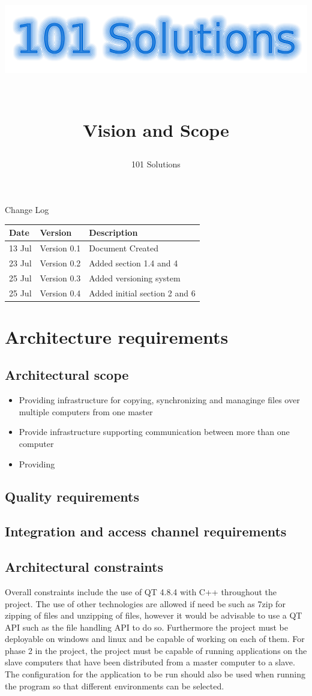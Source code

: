 \documentclass[a4paper,12pt,final]{article}
\title{
\begin{center}
  	\includegraphics[scale=0.3]{101Logo.png} 
  \end{center}
  \textbf{\\}
Vision and Scope\\
}  %
\author{101 Solutions}
\begin{document}
\maketitle
\thispagestyle{empty}
\newpage
\tableofcontents
\thispagestyle{empty}
\newpage
Change Log
\vspace{6pt}\newline
\begin{tabular}{|l|l|l|}
\hline
Date & Version & Description\\
\hline
13 Jul & Version 0.1 & Document Created\\
\hline
23 Jul & Version 0.2 & Added section 1.4 and 4\\
\hline
25 Jul & Version 0.3 & Added versioning system\\
\hline
25 Jul & Version 0.4 & Added initial section 2 and 6\\
\hline
\end{tabular}

\section{Architecture requirements}
\subsection{Architectural scope}
\begin{itemize}
\item Providing infrastructure for copying, synchronizing and managinge files over multiple computers from one master
\item Provide infrastructure supporting communication between more than one computer
\item Providing 
\end{itemize}
\subsection{Quality requirements}
\subsection{Integration and access channel requirements}
\subsection{Architectural constraints}
Overall constraints include the use of QT 4.8.4 with C++ throughout the project. The use of other technologies are allowed if need be such as 7zip for zipping of files and unzipping of files, however it would be advisable to use a QT API such as the file handling API to do so. Furthermore the project must be deployable on windows and linux and be capable of working on each of them.
\vspace{6pt}\newline
For phase 2 in the project, the project must be capable of running applications on the slave computers that have been distributed from a master computer to a slave. The configuration for the application to be run should also be used when running the program so that different environments can be selected.
\end{document}
